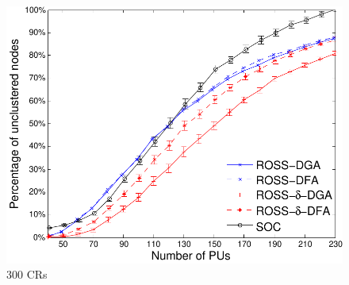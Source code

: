 \documentclass[times]{ettauth}
\theoremstyle{mytheoremstyle}
\theoremstyle{mytheoremstyle}
\theoremstyle{mytheoremstyle}
\begin{document}
\begin{figure}[t]
\begin{multicols}{3}
    \includegraphics[width=\linewidth]{survival_rate_300_edge50.pdf}\par\caption{300 CRs}\label{singleton_clusters_300}
\end{multicols}
\end{figure}

\end{document}
